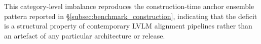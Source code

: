 \documentclass[lettersize,journal]{IEEEtran}
\begin{document}
This category-level imbalance reproduces the construction-time anchor ensemble pattern reported in \S\ref{subsec:benchmark_construction}, indicating that the deficit is a structural property of contemporary LVLM alignment pipelines rather than an artefact of any particular architecture or release.
\end{document}
